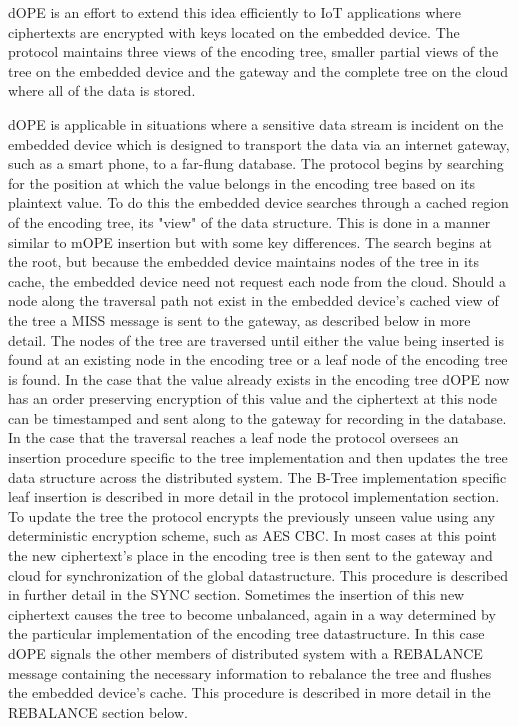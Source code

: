 \documentclass[12pt]{article}
\begin{document}
dOPE is an effort to extend this idea efficiently to IoT applications where ciphertexts are encrypted with keys located on the embedded device.  The protocol maintains three views of the encoding tree, smaller partial views of the tree on the embedded device and the gateway and the complete tree on the cloud where all of the data is stored.

dOPE is applicable in situations where a sensitive data stream is incident on the embedded device which is designed to transport the data via an internet gateway, such as a smart phone, to a far-flung database.  The protocol begins by searching for the position at which the value belongs in the encoding tree based on its plaintext value.  To do this the embedded device searches through a cached region of the encoding tree, its "view" of the data structure.  This is done in a manner similar to mOPE insertion but with some key differences.  The search begins at the root, but because the embedded device maintains nodes of the tree in its cache, the embedded device need not request each node from the cloud.  Should a node along the traversal path not exist in the embedded device's cached view of the tree a MISS message is sent to the gateway, as described below in more detail.  The nodes of the tree are traversed until either the value being inserted is found at an existing node in the encoding tree or a leaf node of the encoding tree is found.  In the case that the value already exists in the encoding tree dOPE now has an order preserving encryption of this value and the ciphertext at this node can be timestamped and sent along to the gateway for recording in the database.  In the case that the traversal reaches a leaf node the protocol oversees an insertion procedure specific to the tree implementation and then updates the tree data structure across the distributed system.  The B-Tree implementation specific leaf insertion is described in more detail in the protocol implementation section.  To update the tree the protocol encrypts the previously unseen value using any deterministic encryption scheme, such as AES CBC.  In most cases at this point the new ciphertext's place in the encoding tree is then sent to the gateway and cloud for synchronization of the global datastructure.  This procedure is described in further detail in the SYNC section.  Sometimes the insertion of this new ciphertext causes the tree to become unbalanced, again in a way determined by the particular implementation of the encoding tree datastructure.  In this case dOPE signals the other members of distributed system with a REBALANCE message containing the necessary information to rebalance the tree and flushes the embedded device's cache.  This procedure is described in more detail in the REBALANCE section below.
\end{document}
